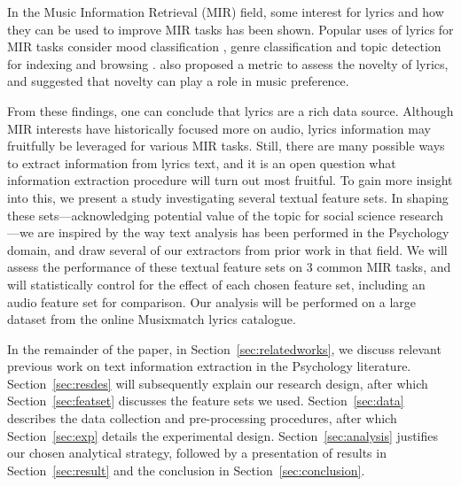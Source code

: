 \documentclass{article}
\begin{document}
In the Music Information Retrieval (MIR) field, some interest for lyrics and how they can be used to improve MIR tasks has been shown. Popular uses of lyrics for MIR tasks consider mood classification \cite{hu2010lyrics,mcvicar2011mining, hu2009lyric,wang2011music}, genre classification \cite{mayer2008rhyme,tsaptsinos2017lyrics} and topic detection for indexing and browsing \cite{kleedorfer2008oh, sasaki2014lyricsradar}. \cite{ellis2015quantifying} also proposed a metric to assess the novelty of lyrics, and suggested that novelty can play a role in music preference.

From these findings, one can conclude that lyrics are a rich data source. Although MIR interests have historically focused more on audio, lyrics information may fruitfully be leveraged for various MIR tasks. Still, there are many possible ways to extract information from lyrics text, and it is an open question what information extraction procedure will turn out most fruitful. To gain more insight into this, we present a study investigating several textual feature sets. In shaping these sets---acknowledging potential value of the topic for social science research---we are inspired by the way text analysis has been performed in the Psychology domain, and draw several of our extractors from prior work in that field. We will assess the performance of these textual feature sets on 3 common MIR tasks, and will statistically control for the effect of each chosen feature set, including an audio feature set for comparison.
Our analysis will be performed on a large dataset from the online Musixmatch lyrics catalogue.

In the remainder of the paper, in Section~\ref{sec:relatedworks}, we discuss relevant previous work on text information extraction in the Psychology literature. Section~\ref{sec:resdes} will subsequently explain our research design, after which Section~\ref{sec:featset} discusses the feature sets we used. Section~\ref{sec:data} describes the data collection and pre-processing procedures, after which Section~\ref{sec:exp} details the experimental design. Section~\ref{sec:analysis} justifies our chosen analytical strategy, followed by a presentation of results in Section~\ref{sec:result} and the conclusion in Section~\ref{sec:conclusion}.

\end{document}
